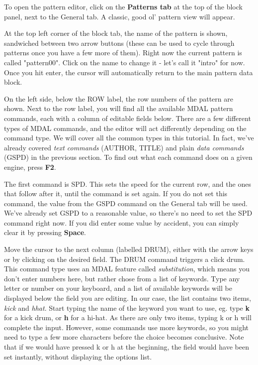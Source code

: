 \documentclass[12pt]{report}	%
\begin{document}
To open the pattern editor, click on the \textbf{Patterns tab} at the top of the block panel, next to the General tab. A classic, good ol' pattern view will appear.

At the top left corner of the block tab, the name of the pattern is shown, sandwiched between two arrow buttons (these can be used to cycle through patterns once you have a few more of them). Right now the current pattern is called "pattern00". Click on the name to change it - let's call it "intro" for now. Once you hit enter, the cursor will automatically return to the main pattern data block.

On the left side, below the ROW label, the row numbers of the pattern are shown. Next to the row label, you will find all the available MDAL pattern commands, each with a column of editable fields below. There are a few different types of MDAL commands, and the editor will act differently depending on the command type. We will cover all the common types in this tutorial. In fact, we've already covered \textit{text commands} (AUTHOR, TITLE) and plain \textit{data commands} (GSPD) in the previous section. To find out what each command does on a given engine, press \textbf{F2}.

The first command is SPD. This sets the speed for the current row, and the ones that follow after it, until the command is set again. If you do not set this command, the value from the GSPD command on the General tab will be used. We've already set GSPD to a reasonable value, so there's no need to set the SPD command right now. If you did enter some value by accident, you can simply clear it by pressing \textbf{Space}.

Move the cursor to the next column (labelled DRUM), either with the arrow keys or by clicking on the desired field. The DRUM command triggers a click drum. This command type uses an MDAL feature called \textit{substitution}, which means you don't enter numbers here, but rather chose from a list of keywords. Type any letter or number on your keyboard, and a list of available keywords will be displayed below the field you are editing. In our case, the list contains two items, \textit{kick} and \textit{hhat}. Start typing the name of the keyword you want to use, eg. type \textbf{k} for a kick drum, or \textbf{h} for a hi-hat. As there are only two items, typing k or h will complete the input. However, some commands use more keywords, so you might need to type a few more characters before the choice becomes conclusive. Note that if we would have pressed k or h at the beginning, the field would have been set instantly, without displaying the options list.
\end{document}
